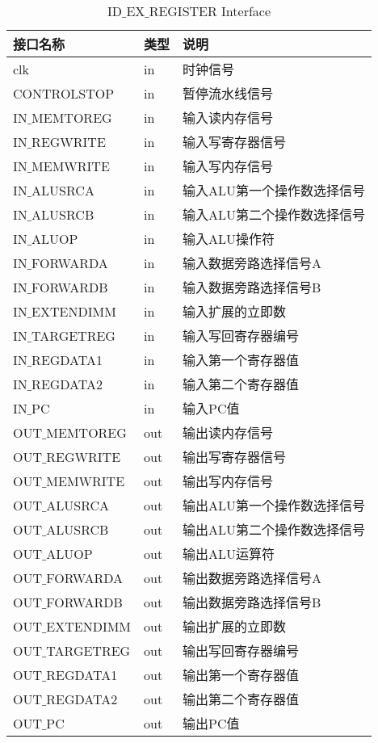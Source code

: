 \begin{center}
\renewcommand{\arraystretch}{1.3}
\small
\begin{longtable}{|p{3cm}<{\centering}|p{1.4cm}<{\centering}|p{7cm}<{\centering}|}
\caption{ID$\_$EX$\_$REGISTER Interface}
\label{tab:treatments}\\
\hline
接口名称 & 类型 & 说明 \\
\hline
clk & in & 时钟信号 \\
\hline
CONTROLSTOP & in & 暂停流水线信号 \\
\hline
IN$\_$MEMTOREG & in & 输入读内存信号 \\
\hline
IN$\_$REGWRITE & in & 输入写寄存器信号 \\
\hline
IN$\_$MEMWRITE & in & 输入写内存信号 \\
\hline
IN$\_$ALUSRCA & in & 输入ALU第一个操作数选择信号 \\
\hline
IN$\_$ALUSRCB & in & 输入ALU第二个操作数选择信号 \\
\hline
IN$\_$ALUOP & in & 输入ALU操作符 \\
\hline
IN$\_$FORWARDA & in & 输入数据旁路选择信号A \\
\hline
IN$\_$FORWARDB & in & 输入数据旁路选择信号B \\
\hline
IN$\_$EXTENDIMM & in & 输入扩展的立即数 \\
\hline
IN$\_$TARGETREG & in & 输入写回寄存器编号 \\
\hline
IN$\_$REGDATA1 & in & 输入第一个寄存器值 \\
\hline
IN$\_$REGDATA2 & in & 输入第二个寄存器值 \\
\hline
IN$\_$PC & in & 输入PC值 \\
\hline
OUT$\_$MEMTOREG & out & 输出读内存信号 \\
\hline
OUT$\_$REGWRITE & out & 输出写寄存器信号 \\
\hline
OUT$\_$MEMWRITE & out & 输出写内存信号 \\
\hline
OUT$\_$ALUSRCA & out & 输出ALU第一个操作数选择信号 \\
\hline
OUT$\_$ALUSRCB & out & 输出ALU第二个操作数选择信号 \\
\hline
OUT$\_$ALUOP & out & 输出ALU运算符  \\
\hline
OUT$\_$FORWARDA & out & 输出数据旁路选择信号A \\
\hline
OUT$\_$FORWARDB & out & 输出数据旁路选择信号B \\
\hline
OUT$\_$EXTENDIMM & out & 输出扩展的立即数 \\
\hline
OUT$\_$TARGETREG & out & 输出写回寄存器编号 \\
\hline
OUT$\_$REGDATA1 & out & 输出第一个寄存器值 \\
\hline
OUT$\_$REGDATA2 & out & 输出第二个寄存器值 \\
\hline
OUT$\_$PC & out & 输出PC值 \\
\hline
\end{longtable}
\end{center}

